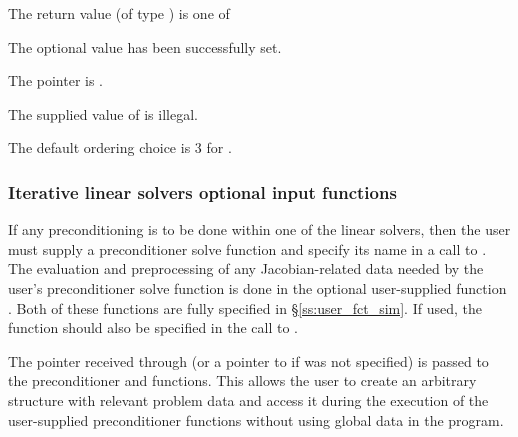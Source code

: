 {
  The return value  (of type ) is one of
  \begin{args}
  \item[\Id{CVSLS\_SUCCESS}] 
    The optional value has been successfully set.
  \item[\Id{CVSLS\_MEM\_NULL}]
    The  pointer is .
  \item[\Id{CVSLS\_ILL\_INPUT}]
    The supplied value of  is illegal.
  \end{args}
}
{
  The default ordering choice is 3 for .
}


\subsubsection{Iterative linear solvers optional input functions}
\label{sss:optin_spils}
If any preconditioning is to be done within one of the {\cvspils} linear
solvers, then the user must supply a preconditioner solve function 
and specify its name in a call to .
The evaluation and preprocessing of any Jacobian-related data needed
by the user's preconditioner solve function is done in the optional
user-supplied function . Both of these functions are
fully specified in \S\ref{ss:user_fct_sim}.
If used, the  function should also be specified in the call to
.

The pointer  received through  (or a pointer to 
if  was not specified) 
is passed to the preconditioner  and  functions.  
This allows the user to create an arbitrary structure with relevant problem data 
and access it during the execution of the user-supplied preconditioner functions
without using global data in the program.  

